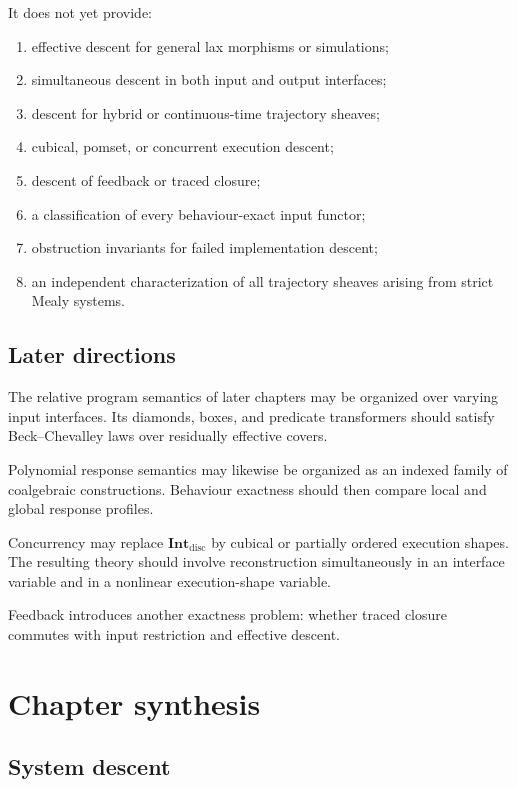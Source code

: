 It does not yet provide:
\begin{enumerate}
    \item effective descent for general lax morphisms or simulations;
    \item simultaneous descent in both input and output interfaces;
    \item descent for hybrid or continuous-time trajectory sheaves;
    \item cubical, pomset, or concurrent execution descent;
    \item descent of feedback or traced closure;
    \item a classification of every behaviour-exact input functor;
    \item obstruction invariants for failed implementation descent;
    \item an independent characterization of all trajectory sheaves arising
    from strict Mealy systems.
\end{enumerate}

\subsection{Later directions}
\label{subsec:later-directions-interface-descent}

The relative program semantics of later chapters may be organized over varying
input interfaces. Its diamonds, boxes, and predicate transformers should
satisfy Beck--Chevalley laws over residually effective covers.

Polynomial response semantics may likewise be organized as an indexed family
of coalgebraic constructions. Behaviour exactness should then compare local
and global response profiles.

Concurrency may replace
\(\mathbf{Int}_{\mathrm{disc}}\) by cubical or partially ordered execution
shapes. The resulting theory should involve reconstruction simultaneously in
an interface variable and in a nonlinear execution-shape variable.

Feedback introduces another exactness problem: whether traced closure commutes
with input restriction and effective descent.

\section{Chapter synthesis}
\label{sec:interface-descent-chapter-synthesis}

\subsection{System descent}
\label{subsec:system-descent-summary}

